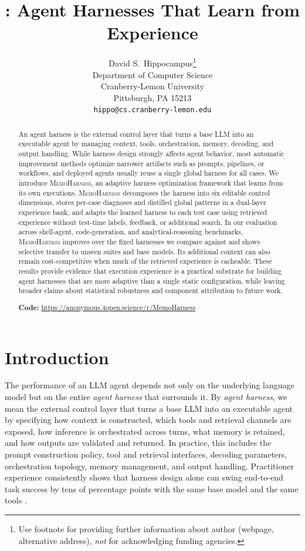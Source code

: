 \documentclass{article}
\title{\method: Agent Harnesses That Learn from Experience}
\author{%
  David S.~Hippocampus\thanks{Use footnote for providing further information
    about author (webpage, alternative address), \emph{not} for acknowledging
    funding agencies.} \\
  Department of Computer Science\\
  Cranberry-Lemon University\\
  Pittsburgh, PA 15213 \\
  \texttt{hippo@cs.cranberry-lemon.edu} \\
}
\newcommand{\method}{\textsc{MemoHarness}\xspace}
\begin{document}
\maketitle


\begin{abstract}
  An agent harness is the external control layer that turns a base LLM into an
  executable agent by managing context, tools, orchestration, memory, decoding,
  and output handling. While harness design strongly affects agent behavior,
  most automatic improvement methods optimize narrower artifacts such as
  prompts, pipelines, or workflows, and deployed agents usually reuse a single
  global harness for all cases. We introduce \method, an adaptive harness
  optimization framework that learns from its own executions. \method
  decomposes the harness into six editable control dimensions, stores per-case
  diagnoses and distilled global patterns in a dual-layer experience bank, and
  adapts the learned harness to each test case using retrieved experience
  without test-time labels, feedback, or additional search. In our evaluation
  across shell-agent, code-generation, and analytical-reasoning benchmarks,
  \method improves over the fixed harnesses we compare against and shows
  selective transfer to unseen suites and base models. Its additional context
  can also remain cost-competitive when much of the retrieved experience is
  cacheable. These results provide evidence that execution experience is a
  practical substrate for building agent harnesses that are more adaptive than a
  single static configuration, while leaving broader claims about statistical
  robustness and component attribution to future work.

\begin{center}
\textbf{Code:} \url{https://anonymous.4open.science/r/MemoHarness}
\end{center}
\end{abstract}

\section{Introduction}
\label{sec:introduction}

The performance of an LLM agent depends not only on the underlying
language model but on the entire \emph{agent harness} that surrounds
it. By \emph{agent harness}, we mean the external control layer that
turns a base LLM into an executable agent by specifying how context is
constructed, which tools and retrieval channels are exposed, how
inference is orchestrated across turns, what memory is retained, and
how outputs are validated and returned. In practice, this includes the
prompt construction policy, tool and retrieval interfaces, decoding
parameters, orchestration topology, memory management, and output
handling. Practitioner experience consistently shows that harness
design alone can swing end-to-end task success by tens of percentage
points with the same base model and the same tools
\citep{lopopolo2026harness, langchain2025context}.
\end{document}

